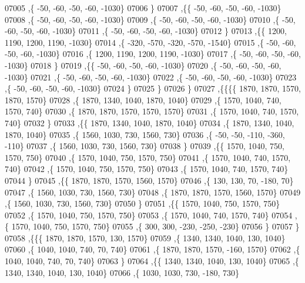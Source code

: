 \begin{DoxyCode}
07005     ,\{   -50,   -60,   -50,   -60, -1030\}
07006     \}
07007    ,\{\{   -50,   -60,   -50,   -60, -1030\}
07008     ,\{   -50,   -60,   -50,   -60, -1030\}
07009     ,\{   -50,   -60,   -50,   -60, -1030\}
07010     ,\{   -50,   -60,   -50,   -60, -1030\}
07011     ,\{   -50,   -60,   -50,   -60, -1030\}
07012     \}
07013    ,\{\{  1200,  1190,  1200,  1190, -1030\}
07014     ,\{  -320,  -570,  -320,  -570, -1540\}
07015     ,\{   -50,   -60,   -50,   -60, -1030\}
07016     ,\{  1200,  1190,  1200,  1190, -1030\}
07017     ,\{   -50,   -60,   -50,   -60, -1030\}
07018     \}
07019    ,\{\{   -50,   -60,   -50,   -60, -1030\}
07020     ,\{   -50,   -60,   -50,   -60, -1030\}
07021     ,\{   -50,   -60,   -50,   -60, -1030\}
07022     ,\{   -50,   -60,   -50,   -60, -1030\}
07023     ,\{   -50,   -60,   -50,   -60, -1030\}
07024     \}
07025    \}
07026   \}
07027  ,\{\{\{\{  1870,  1870,  1570,  1870,  1570\}
07028     ,\{  1870,  1340,  1040,  1870,  1040\}
07029     ,\{  1570,  1040,   740,  1570,   740\}
07030     ,\{  1870,  1870,  1570,  1570,  1570\}
07031     ,\{  1570,  1040,   740,  1570,   740\}
07032     \}
07033    ,\{\{  1870,  1340,  1040,  1870,  1040\}
07034     ,\{  1870,  1340,  1040,  1870,  1040\}
07035     ,\{  1560,  1030,   730,  1560,   730\}
07036     ,\{   -50,   -50,  -110,  -360,  -110\}
07037     ,\{  1560,  1030,   730,  1560,   730\}
07038     \}
07039    ,\{\{  1570,  1040,   750,  1570,   750\}
07040     ,\{  1570,  1040,   750,  1570,   750\}
07041     ,\{  1570,  1040,   740,  1570,   740\}
07042     ,\{  1570,  1040,   750,  1570,   750\}
07043     ,\{  1570,  1040,   740,  1570,   740\}
07044     \}
07045    ,\{\{  1870,  1870,  1570,  1560,  1570\}
07046     ,\{   130,   130,    70,  -180,    70\}
07047     ,\{  1560,  1030,   730,  1560,   730\}
07048     ,\{  1870,  1870,  1570,  1560,  1570\}
07049     ,\{  1560,  1030,   730,  1560,   730\}
07050     \}
07051    ,\{\{  1570,  1040,   750,  1570,   750\}
07052     ,\{  1570,  1040,   750,  1570,   750\}
07053     ,\{  1570,  1040,   740,  1570,   740\}
07054     ,\{  1570,  1040,   750,  1570,   750\}
07055     ,\{   300,   300,  -230,  -250,  -230\}
07056     \}
07057    \}
07058   ,\{\{\{  1870,  1870,  1570,   130,  1570\}
07059     ,\{  1340,  1340,  1040,   130,  1040\}
07060     ,\{  1040,  1040,   740,    70,   740\}
07061     ,\{  1870,  1870,  1570,  -160,  1570\}
07062     ,\{  1040,  1040,   740,    70,   740\}
07063     \}
07064    ,\{\{  1340,  1340,  1040,   130,  1040\}
07065     ,\{  1340,  1340,  1040,   130,  1040\}
07066     ,\{  1030,  1030,   730,  -180,   730\}

\end{DoxyCode}
